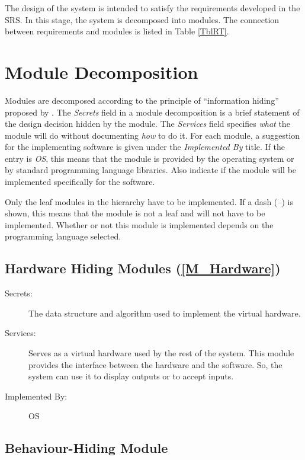 \documentclass[12pt, titlepage]{article}
\begin{document}
The design of the system is intended to satisfy the requirements developed in
the SRS. In this stage, the system is decomposed into modules. The connection
between requirements and modules is listed in Table \ref{TblRT}.

\section{Module Decomposition} \label{SecMD}

Modules are decomposed according to the principle of ``information hiding''
proposed by \cite{ParnasEtAl1984}. The \emph{Secrets} field in a module
decomposition is a brief statement of the design decision hidden by the
module. The \emph{Services} field specifies \emph{what} the module will do
without documenting \emph{how} to do it. For each module, a suggestion for the
implementing software is given under the \emph{Implemented By} title. If the
entry is \emph{OS}, this means that the module is provided by the operating
system or by standard programming language libraries.  Also indicate if the
module will be implemented specifically for the software.

Only the leaf modules in the
hierarchy have to be implemented. If a dash (\emph{--}) is shown, this means
that the module is not a leaf and will not have to be implemented. Whether or
not this module is implemented depends on the programming language
selected.

\subsection{Hardware Hiding Modules (\texorpdfstring{\cref{M_Hardware}}))}

\begin{description}
\item[Secrets:]The data structure and algorithm used to implement the virtual 
hardware.
\item[Services:]Serves as a virtual hardware used by the rest of the system. 
This module provides the interface between the hardware and the software. So, 
the system can use it to display outputs or to accept inputs.
\item[Implemented By:] OS
\end{description}

\subsection{Behaviour-Hiding Module}
\end{document}
